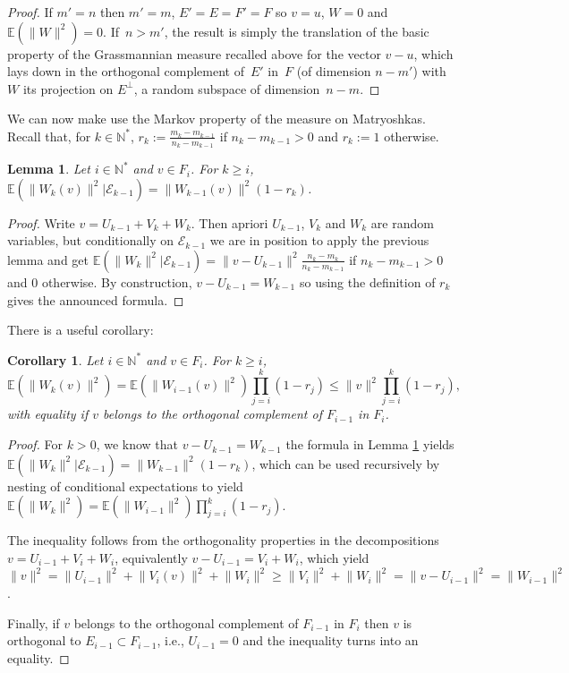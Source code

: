 \documentclass[pdftex]{sigma}%
\newcommand{\norm}[1]{\lVert #1\rVert}
\newcommand{\kN}{k\in \mathbb{N}}
\newcommand{\iN}{i\in \mathbb{N}}
\newcommand{\expec}[1]{\mathbb{E}\left(#1\right)}
\newcommand{\algE}{{\mathcal E}}
\newtheorem{Corollary}[Theorem]{Corollary}
\newtheorem{Lemma}[Theorem]{Lemma}
\begin{document}
\begin{proof}
If $m'=n$ then $m'=m$, $E'=E=F'=F$ so $v=u$, $W=0$ and $\expec{\norm{W}^2}=0$. If~$n>m'$, the result is simply the translation of the basic property of the Grassmannian measure recalled above for the vector $v-u$, which lays down in the orthogonal complement of~$E'$ in~$F$ (of dimension $n-m'$) with $W$ its projection on $E^{\perp}$, a random subspace of dimen\-sion~$n-m$.
\end{proof}

We can now make use the Markov property of the measure on Matryoshkas. Recall that, for $\kN^*$, $r_k:=\frac{m_k-m_{k-1}}{n_{k}-m_{k-1}}$ if $n_{k}-m_{k-1}>0$ and $r_k:=1$ otherwise.

\begin{Lemma} \label{lem:markovMatryoshkas} Let $\iN^*$ and $v\in F_i$.
 For $k\geq i$, $\expec{\norm{W_k(v)}^2|\algE_{k-1}}=\norm{W_{k-1}(v)}^2(1-r_k)$.
\end{Lemma}

\begin{proof}
Write $v=U_{k-1}+V_k+W_k$. Then apriori $U_{k-1}$, $V_k$ and $W_k$ are random variables, but conditionally on $\algE_{k-1}$ we are in position to apply the previous lemma and get $\expec{\norm{W_k}^2|\algE_{k-1}}=\norm{v-U_{k-1}}^2\frac{n_k-m_k}{n_k-m_{k-1}}$ if $n_{k}-m_{k-1}>0$ and $0$ otherwise. By construction, $v-U_{k-1}=W_{k-1}$ so using the definition of $r_k$ gives the announced formula.
\end{proof}

There is a useful corollary:

\begin{Corollary} \label{cor:prodineq} Let $\iN^*$ and $v\in F_i$.
For $k \geq i$,
\[
\expec{\norm{W_k(v)}^2}=\expec{\norm{W_{i-1}(v)}^2}\prod_{j=i}^{k} (1-r_j) \leq \norm{v}^2\prod_{j=i}^{k} (1-r_j),
\]
with equality if $v$ belongs to the orthogonal complement of $F_{i-1}$ in $F_i$.
\end{Corollary}

\begin{proof}
{\sloppy
For $k>0$, we know that $v-U_{k-1}=W_{k-1}$ the formula in Lemma \ref{lem:markovMatryoshkas} yields $\expec{\norm{W_k}^2|\algE_{k-1}}\allowbreak=\norm{W_{k-1}}^2(1-r_k)$, which can be used recursively by nesting of conditional expectations to yield $\expec{\norm{W_k}^2}=\expec{\norm{W_{i-1}}^2}\prod_{j=i}^{k} (1-r_j)$.\footnotemark

}

The inequality follows from the orthogonality properties in the decompositions $v=U_{i-1} + V_i + W_i$, equivalently $v-U_{i-1}= V_i + W_i$, which yield $\norm{v}^2= \norm{U_{i-1}}^2+\norm{V_i(v)}^2+\norm{W_i}^2 \geq \norm{V_i}^2+\norm{W_i}^2=\norm{v-U_{i-1}}^2=\norm{W_{i-1}}^2$.

Finally, if $v$ belongs to the orthogonal complement of $F_{i-1}$ in $F_i$ then $v$ is orthogonal to $E_{i-1} \subset F_{i-1}$, i.e., $U_{i-1}=0$ and the inequality turns into an equality.
\end{proof}
\end{document}
